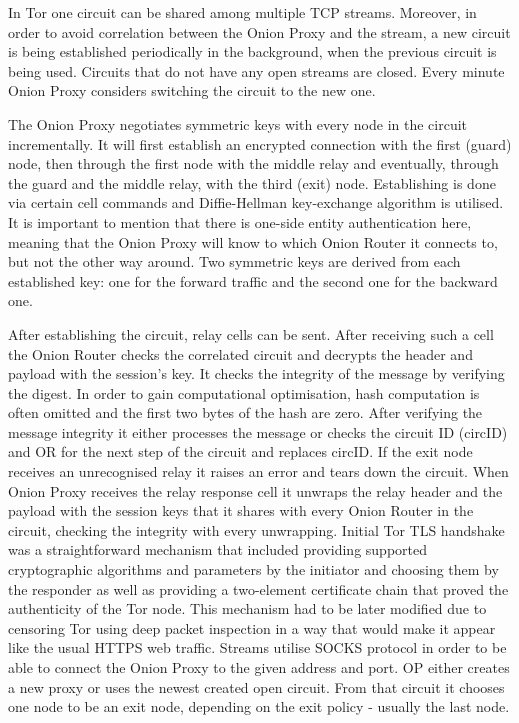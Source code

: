 In Tor one circuit can be shared among multiple TCP streams. Moreover, in order to avoid correlation between the Onion Proxy and the stream, a new circuit is being established periodically in the background, when the previous circuit is being used. Circuits that do not have any open streams are closed. Every minute Onion Proxy considers switching the circuit to the new one.

The Onion Proxy negotiates symmetric keys with every node in the circuit incrementally. It will first establish an encrypted connection with the first (guard) node, then through the first node with the middle relay and eventually, through the guard and the middle relay, with the third (exit) node. Establishing is done via certain cell commands and Diffie-Hellman key-exchange algorithm is utilised. It is important to mention that there is one-side entity authentication here, meaning that the Onion Proxy will know to which Onion Router it connects to, but not the other way around. Two symmetric keys are derived from each established key: one for the forward traffic and the second one for the backward one.

After establishing the circuit, relay cells can be sent. After receiving such a cell the Onion Router checks the correlated circuit and decrypts the header and payload with the session’s key. It checks the integrity of the message by verifying the digest. In order to gain computational optimisation, hash computation is often omitted and the first two bytes of the hash are zero. After verifying the message integrity it either processes the message or checks the circuit ID (circID) and OR for the next step of the circuit and replaces circID. If the exit node receives an unrecognised relay it raises an error and tears down the circuit. When Onion Proxy receives the relay response cell it unwraps the relay header and the payload with the session keys that it shares with every Onion Router in the circuit, checking the integrity with every unwrapping. 
Initial Tor TLS handshake was a straightforward mechanism that included providing supported cryptographic algorithms and parameters by the initiator and choosing them by the responder as well as providing a two-element certificate chain that proved the authenticity of the Tor node. This mechanism had to be later modified due to censoring Tor using deep packet inspection in a way that would make it appear like the usual HTTPS web traffic.
Streams utilise SOCKS protocol in order to be able to connect the Onion Proxy to the given address and port. OP either creates a new proxy or uses the newest created open circuit. From that circuit it chooses one node to be an exit node, depending on the exit policy - usually the last node.


